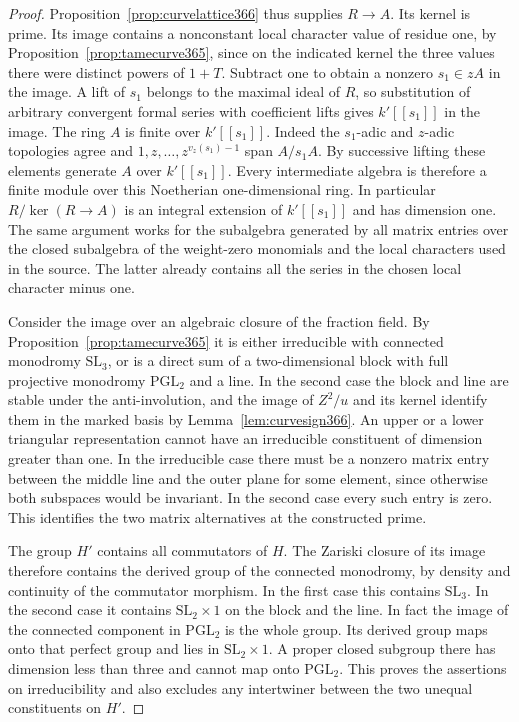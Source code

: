 \documentclass[a4paper,11pt]{article}
\theoremstyle{definition}
\theoremstyle{remark}
\numberwithin{equation}{section}
\begin{document}
\begin{proof}
Proposition~\ref{prop:curvelattice366} thus supplies
\(R\to A\). Its kernel is prime. Its image contains a
nonconstant local character value of residue one, by
Proposition~\ref{prop:tamecurve365}, since on the indicated
kernel the three values there were distinct powers of \(1+T\).
Subtract one to obtain a nonzero \(s_1\in zA\) in the image.
A lift of \(s_1\) belongs to the maximal ideal of \(R\),
so substitution of arbitrary convergent formal series with
coefficient lifts gives \(k'[[s_1]]\) in the image. The ring
\(A\) is finite over \(k'[[s_1]]\). Indeed the \(s_1\)-adic
and \(z\)-adic topologies agree and
\(1,z,\ldots,z^{v_z(s_1)-1}\) span \(A/s_1A\). By successive
lifting these elements generate \(A\) over \(k'[[s_1]]\).
Every intermediate algebra is therefore a finite module over
this Noetherian one-dimensional ring. In particular
\(R/\ker(R\to A)\) is an integral extension of \(k'[[s_1]]\)
and has dimension one. The same argument works for the
subalgebra generated by all matrix entries over the closed
subalgebra of the weight-zero monomials and the local
characters used in the source. The latter already contains
all the series in the chosen local character minus one.

Consider the image over an algebraic closure of the fraction
field. By Proposition~\ref{prop:tamecurve365} it is either
irreducible with connected monodromy \(\mathrm{SL}_3\), or
is a direct sum of a two-dimensional block with full
projective monodromy \(\mathrm{PGL}_2\) and a line. In the
second case the block and line are stable under the
anti-involution, and the image of \(Z^2/u\) and its kernel
identify them in the marked basis by Lemma~\ref{lem:curvesign366}.
An upper or a lower triangular representation cannot have
an irreducible constituent of dimension greater than one.
In the irreducible case there must be a nonzero matrix entry
between the middle line and the outer plane for some element,
since otherwise both subspaces would be invariant. In the
second case every such entry is zero. This identifies the
two matrix alternatives at the constructed prime.

The group \(H'\) contains all commutators of \(H\). The
Zariski closure of its image therefore contains the derived
group of the connected monodromy, by density and continuity
of the commutator morphism. In the first case this contains
\(\mathrm{SL}_3\). In the second case it contains
\(\mathrm{SL}_2\times1\) on the block and the line. In fact
the image of the connected component in \(\mathrm{PGL}_2\)
is the whole group. Its derived group maps onto that perfect
group and lies in \(\mathrm{SL}_2\times1\). A proper closed
subgroup there has dimension less than three and cannot map
onto \(\mathrm{PGL}_2\). This proves the assertions on
irreducibility and also excludes any intertwiner between
the two unequal constituents on \(H'\).


\end{proof}
\end{document}
